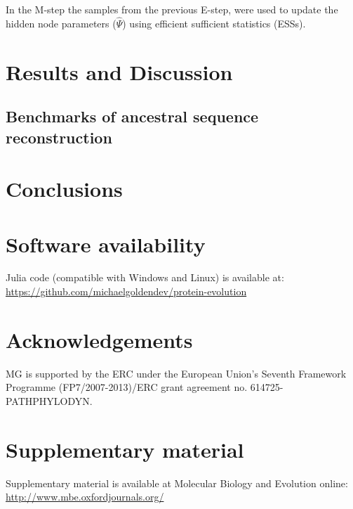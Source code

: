 \documentclass[nogrid]{MBE}%
\begin{document}
In the M-step the samples from the previous E-step, were used to update the hidden node parameters ($\hat{\Psi}$) using efficient sufficient statistics (ESSs).

\section{Results and Discussion}

\subsection{Benchmarks of ancestral sequence reconstruction}
	
\section{Conclusions}

\section{Software availability}
Julia code (compatible with Windows and Linux) is available at: \href{https://github.com/michaelgoldendev/protein-evolution}{https://github.com/michaelgoldendev/protein-evolution}

\section{Acknowledgements}
MG is supported by the ERC under the European Union’s Seventh Framework Programme (FP7/2007-2013)/ERC grant agreement no. 614725-PATHPHYLODYN. 

\ifmbeformat
\section{Supplementary material}
Supplementary material is available  at Molecular Biology and Evolution
online: \url{http://www.mbe.oxfordjournals.org/}
\fi

\end{document}
